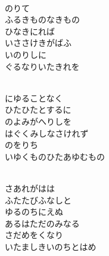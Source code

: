 \documentclass[10pt,b5j]{tarticle} %
\begin{document}
\vspace{1.5em} %
\newcommand{\linespace}{0.5em} %
\newcommand{\blocksize}{0.5\hsize} %
\newcommand{\itemmargin}{3em} %
\begin{enumerate} %
    \setlength{\itemindent}{\itemmargin} %
    \begin{minipage}[c]{\blocksize}
    
        \vspace{\linespace}
        \item~\\
        のりて\\
        ふるきものなきもの\\
        ひなきにれば\\
        いささけきがばふ\\
        いのりしに\\
        ぐるなりいたきれを
        
    \end{minipage}
    \begin{minipage}[c]{\blocksize}
        
        \vspace{\linespace}
        \item~\\
        にゆることなく\\
        ひたひたとするに\\
        のよみがへりしを\\
        はぐくみしなさけれず\\
        のをりち\\
        いゆくものひたあゆむもの
        
    \end{minipage}
    \begin{minipage}[c]{\blocksize}
        
        \vspace{\linespace}
        \item~\\
        さあれがはは\\
        ふたたびふなしと\\
        ゆるのちにえぬ\\
        あるはただのみなる\\
        さだめをくなり\\
        いたましきいのちとはめ
        

\end{minipage}
\end{enumerate}
\end{document}
